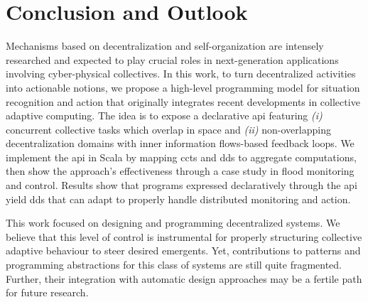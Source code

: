 \section{Conclusion and Outlook}\label{sec:conc}


Mechanisms based on decentralization and self-organization
 are intensely researched
 and expected to play crucial roles in 
 next-generation applications
 involving %
 cyber-physical collectives.
%
In this work,
 to turn decentralized activities into actionable notions,
 we propose a high-level programming model
 for situation recognition and action
 that originally integrates 
 recent developments
 in collective adaptive computing.
%
The idea is to expose a declarative \ac{api}
featuring
 \emph{(i)} concurrent collective tasks which overlap in space
 and
 \emph{(ii)} non-overlapping decentralization domains
 with inner information flows-based feedback loops.
%
We implement the \ac{api} in Scala
 by mapping \acp{cct} and \acp{dd}
 to \scafi{} aggregate computations,
 then show the approach's effectiveness
 through a case study in flood monitoring and control.
%
Results show that programs expressed declaratively through the \ac{api}
yield \acp{dd}
that can adapt to properly handle distributed monitoring and action.

This work focused on designing and programming 
 decentralized systems.
%
We believe that this level of control 
 is instrumental for properly structuring
 collective adaptive behaviour
 to steer desired emergents.
%
Yet, contributions to patterns and programming abstractions
 for this class of systems
 are still quite fragmented.
%
Further, their integration with automatic design approaches
 may be a fertile path for future research.

\printbibliography
